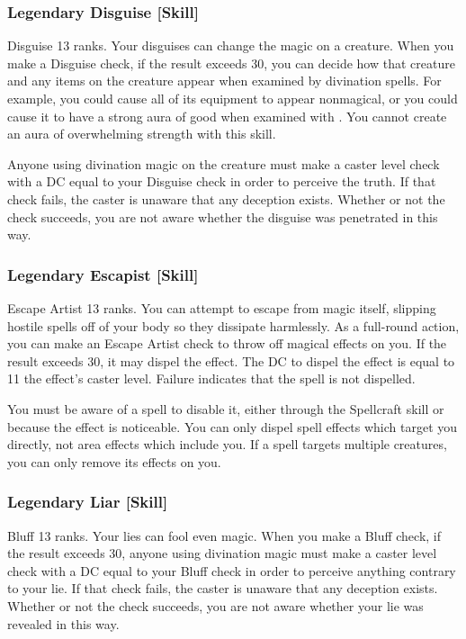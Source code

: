 \subsubsection{Legendary Disguise [Skill]}
\featpre Disguise 13 ranks.
\featben Your disguises can change the magic on a creature. When you make a Disguise check, if the result exceeds 30, you can decide how that creature and any items on the creature appear when examined by divination spells. For example, you could cause all of its equipment to appear nonmagical, or you could cause it to have a strong aura of good when examined with . You cannot create an aura of overwhelming strength with this skill.

Anyone using divination magic on the creature must make a caster level check with a DC equal to your Disguise check in order to perceive the truth. If that check fails, the caster is unaware that any deception exists. Whether or not the check succeeds, you are not aware whether the disguise was penetrated in this way.

\subsubsection{Legendary Escapist [Skill]}
\featpre Escape Artist 13 ranks.
\featben You can attempt to escape from magic itself, slipping hostile spells off of your body so they dissipate harmlessly. As a full-round action, you can make an Escape Artist check to throw off magical effects on you. If the result exceeds 30, it may dispel the effect. The DC to dispel the effect is equal to 11 \add the effect's caster level. Failure indicates that the spell is not dispelled.

You must be aware of a spell to disable it, either through the Spellcraft skill or because the effect is noticeable. You can only dispel spell effects which target you directly, not area effects which include you. If a spell targets multiple creatures, you can only remove its effects on you.

\subsubsection{Legendary Liar [Skill]}
\featpre Bluff 13 ranks.
\featben Your lies can fool even magic. When you make a Bluff check, if the result exceeds 30, anyone using divination magic must make a caster level check with a DC equal to your Bluff check in order to perceive anything contrary to your lie. If that check fails, the caster is unaware that any deception exists. Whether or not the check succeeds, you are not aware whether your lie was revealed in this way.

